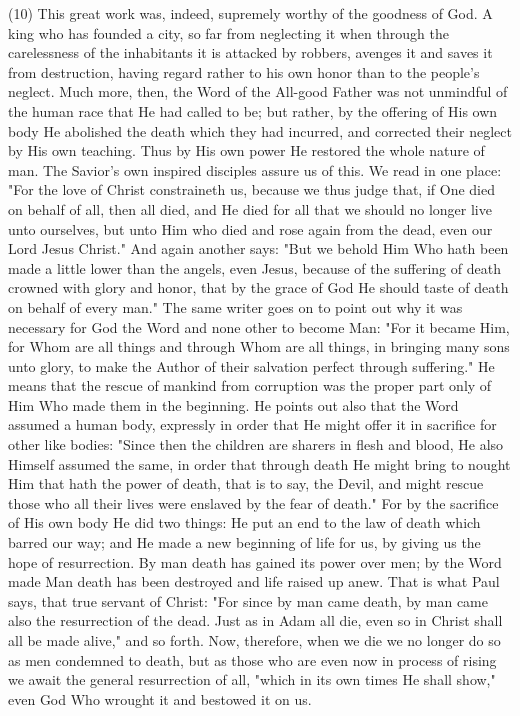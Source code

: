 \documentclass[9pt, twocolumn, oneside, a4paper]{memoir}
\begin{document}
\textsc{(10)} This great work was, indeed, supremely worthy of       the goodness of God. A king who has founded a city, so far from neglecting it       when through the carelessness of the inhabitants it is attacked by robbers,       avenges it and saves it from destruction, having regard rather to his own honor       than to the people's neglect. Much more, then, the Word of the All-good Father       was not unmindful of the human race that He had called to be; but rather, by the       offering of His own body He abolished the death which they had incurred, and       corrected their neglect by His own teaching. Thus by His own power He restored       the whole nature of man. The Savior's own inspired disciples assure us of this.       We read in one place: "For the love of Christ constraineth us, because we       thus judge that, if One died on behalf of all, then all died, and He died for       all that we should no longer live unto ourselves, but unto Him who died       and       rose again from the dead, even our Lord Jesus Christ."       And again another says:       "But we behold Him Who hath been made a little lower than the       angels, even Jesus, because of the suffering of death crowned with glory and       honor, that by the grace of God He should taste of death on behalf of every man."       The same writer goes on to point out why it was necessary for       God the Word and none other to become Man:       "For it became Him, for Whom are all things and through       Whom are all things, in bringing many sons unto glory, to make the Author of       their salvation perfect through suffering."              He means that the rescue of mankind from corruption was the proper       part only of Him Who made them in the beginning. He points out also that the       Word assumed a human body, expressly in order that He might offer it in       sacrifice for other like bodies:       "Since then the children are sharers in flesh and       blood, He also Himself assumed the same, in order that through death He might       bring to nought Him that hath the power of death, that is to say, the Devil,       and might rescue those who all their lives were enslaved by the fear of       death."       For by the sacrifice of His own body He did two things: He put an       end to the law of death which barred our way; and He made a new beginning of       life for us, by giving us the hope of resurrection. By man death has gained its       power over men; by the Word made Man death has been destroyed and life raised up       anew. That is what Paul says, that true servant of Christ:       "For since by man came death, by man came also the       resurrection of the dead. Just as in Adam all die, even so in Christ shall all       be made alive,"       and so forth. Now, therefore, when we die we no longer do so as men       condemned to death, but as those who are even now in process of rising we await       the general resurrection of all, "which in its own times He shall       show,"       even God Who wrought it and bestowed it on us.   
\end{document}
